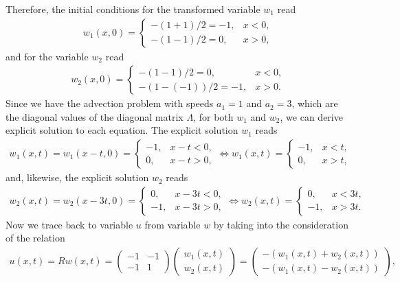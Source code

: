 \documentclass[12pt]{article}
\begin{document}
Therefore, the initial conditions for the transformed variable $w_1$ read
\begin{align*}
	w_1(x, 0) =
	\begin{cases}
		-(1+1)/2=-1, & x < 0, \\
		-(1-1)/2=0,  & x > 0,
	\end{cases}
\end{align*}
and for the variable $w_2$ read
\begin{align*}
	w_2(x, 0) =
	\begin{cases}
		-(1-1)/2=0,     & x < 0, \\
		-(1-(-1))/2=-1, & x > 0.
	\end{cases}
\end{align*}
Since we have the advection problem with speeds
$a_1=1$ and $a_2=3$, which are the diagonal values of the diagonal matrix $\Lambda$, for both $w_1$ and $w_2$,
we can derive explicit solution to each equation. The explicit solution $w_1$ reads
\begin{align*}
	w_1(x, t)
	= w_1(x-t, 0)
	=
	\begin{cases}
		-1, & x-t < 0, \\
		0,  & x-t > 0,
	\end{cases}
	\Leftrightarrow
	w_1(x, t) =
	\begin{cases}
		-1, & x<t, \\
		0,  & x>t,
	\end{cases}
\end{align*}
and, likewise, the explicit solution $w_2$ reads
\begin{align*}
	w_2(x, t)
	= w_2(x-3t,0)
	=
	\begin{cases}
		0,  & x-3t < 0, \\
		-1, & x-3t > 0,
	\end{cases}
	\Leftrightarrow
	w_2(x, t) =
	\begin{cases}
		0,  & x<3t, \\
		-1, & x>3t.
	\end{cases}
\end{align*}
Now we trace back to variable $u$ from variable $w$ by taking into the consideration of the relation
\begin{align*}
	u(x,t) = Rw(x,t) =
	\begin{pmatrix}
		-1 & -1 \\ -1 & 1
	\end{pmatrix}
	\begin{pmatrix}
		w_{1}(x,t) \\ w_{2}(x,t)
	\end{pmatrix}
	=
	\begin{pmatrix}
		-\left(w_{1}(x,t) + w_{2}(x,t)\right) \\
		-\left(w_{1}(x,t) - w_{2}(x,t)\right)
	\end{pmatrix},
\end{align*}
\end{document}
